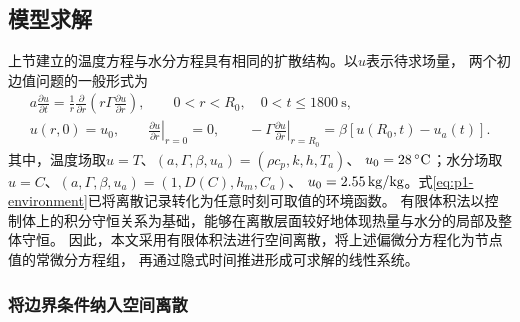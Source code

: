 \subsection{模型求解}
\label{sec:p1-solution}

上节建立的温度方程与水分方程具有相同的扩散结构。以$u$表示待求场量，
两个初边值问题的一般形式为
\begin{equation*}
\begin{gathered}
  a\frac{\partial u}{\partial t}
    =\frac{1}{r}\frac{\partial}{\partial r}
      \left(r\Gamma\frac{\partial u}{\partial r}\right),
    \qquad 0<r<R_0,\quad 0<t\le1800\ \mathrm{s},\\
  u(r,0)=u_0,\qquad
  \left.\frac{\partial u}{\partial r}\right|_{r=0}=0,\qquad
  -\left.\Gamma\frac{\partial u}{\partial r}\right|_{r=R_0}
    =\beta[u(R_0,t)-u_a(t)].
\end{gathered}
\end{equation*}
其中，温度场取$u=T$、$(a,\Gamma,\beta,u_a)=(\rho c_p,k,h,T_a)$、
$u_0=28\,{}^{\circ}\mathrm{C}$；水分场取$u=C$、$(a,\Gamma,\beta,u_a)=(1,D(C),h_m,C_a)$、
$u_0=2.55\,\mathrm{kg/kg}$。式\eqref{eq:p1-environment}已将离散记录转化为任意时刻可取值的环境函数。
有限体积法以控制体上的积分守恒关系为基础，能够在离散层面较好地体现热量与水分的局部及整体守恒\cite{nht}。
因此，本文采用有限体积法进行空间离散，将上述偏微分方程化为节点值的常微分方程组，
再通过隐式时间推进形成可求解的线性系统。

\subsubsection{将边界条件纳入空间离散}

